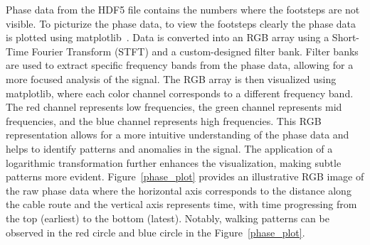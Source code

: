 \begin{table}[ht]
  \centering
  \caption{Phase data from the HDF5 file in the DataFrame format}
  \label{tab:phase_data}
\end{table}

Phase data from the HDF5 file contains the numbers where the footsteps are not visible. To picturize the phase data, to view the footsteps clearly the phase data is plotted using matplotlib~\cite{hunter2007matplotlib}. Data is converted into an RGB array using a Short-Time Fourier Transform (STFT) and a custom-designed filter bank. Filter banks are used to extract specific frequency bands from the phase data, allowing for a more focused analysis of the signal. The RGB array is then visualized using matplotlib, where each color channel corresponds to a different frequency band. The red channel represents low frequencies, the green channel represents mid frequencies, and the blue channel represents high frequencies. This RGB representation allows for a more intuitive understanding of the phase data and helps to identify patterns and anomalies in the signal. The application of a logarithmic transformation further enhances the visualization, making subtle patterns more evident. Figure~\ref{phase_plot} provides an illustrative RGB image of the raw phase data where the horizontal axis corresponds to the distance along the cable route and the vertical axis represents time, with time progressing from the top (earliest) to the bottom (latest). Notably, walking patterns can be observed in the red circle and blue circle in the Figure~\ref{phase_plot}.

